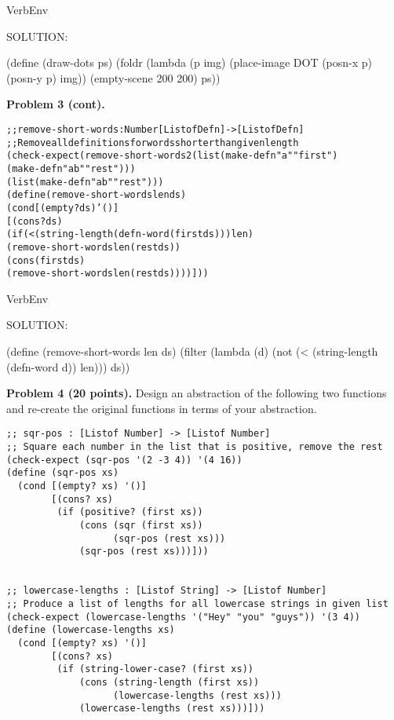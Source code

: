 \documentclass[12pt]{article}
\begin{document}
\begin{SaveVerbatim}{VerbEnv}

SOLUTION:

(define (draw-dots ps)
  (foldr (lambda (p img) (place-image DOT (posn-x p) (posn-y p) img))
         (empty-scene 200 200)
         ps))

\end{SaveVerbatim}




\newpage
\noindent
{\bf Problem 3 (cont).}

\begin{alltt}
;; remove-short-words : Number [Listof Defn] -> [Listof Defn]
;; Remove all definitions for words shorter than given length
(check-expect (remove-short-words 2 (list (make-defn "a" "first") 
                                          (make-defn "ab" "rest")))
              (list (make-defn "ab" "rest")))
(define (remove-short-words len ds)
  (cond [(empty? ds) '()]
        [(cons? ds)
         (if (< (string-length (defn-word (first ds))) len)
             (remove-short-words len (rest ds))
             (cons (first ds)
                   (remove-short-words len (rest ds))))]))
\end{alltt}


\begin{SaveVerbatim}{VerbEnv}

SOLUTION:

(define (remove-short-words len ds)
  (filter (lambda (d) (not (< (string-length (defn-word d)) len))) ds))

\end{SaveVerbatim}




\newpage

\noindent
{\bf Problem 4 (20 points).}
%
Design an abstraction of the following two functions and re-create
the original functions in terms of your abstraction.

\begin{verbatim}
;; sqr-pos : [Listof Number] -> [Listof Number]
;; Square each number in the list that is positive, remove the rest
(check-expect (sqr-pos '(2 -3 4)) '(4 16))
(define (sqr-pos xs)
  (cond [(empty? xs) '()]
        [(cons? xs)
         (if (positive? (first xs))
             (cons (sqr (first xs))
                   (sqr-pos (rest xs)))
             (sqr-pos (rest xs)))]))


;; lowercase-lengths : [Listof String] -> [Listof Number]
;; Produce a list of lengths for all lowercase strings in given list
(check-expect (lowercase-lengths '("Hey" "you" "guys")) '(3 4))
(define (lowercase-lengths xs)
  (cond [(empty? xs) '()]
        [(cons? xs)
         (if (string-lower-case? (first xs))
             (cons (string-length (first xs))
                   (lowercase-lengths (rest xs)))
             (lowercase-lengths (rest xs)))]))
\end{verbatim}
\end{document}
